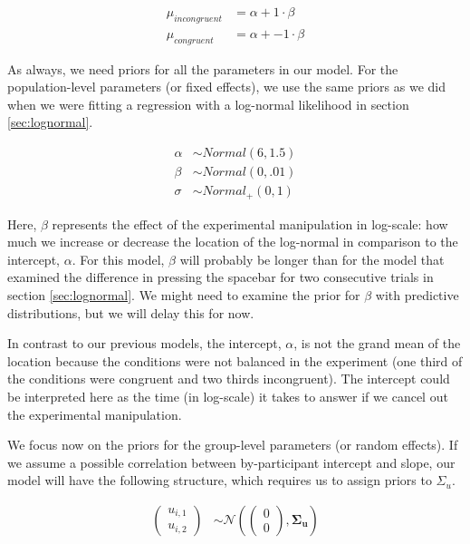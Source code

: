 \documentclass[12pt,]{krantz}
\theoremstyle{definition}
\theoremstyle{definition}
\theoremstyle{definition}
\theoremstyle{remark}
\begin{document}
\begin{equation}
\begin{aligned}
  \mu_{incongruent} &= \alpha + 1 \cdot  \beta \\
  \mu_{congruent} &= \alpha + -1 \cdot  \beta
  \end{aligned}
\end{equation}

As always, we need priors for all the parameters in our model. For the population-level parameters (or fixed effects), we use the same priors as we did when we were fitting a regression with a log-normal likelihood in section \ref{sec:lognormal}.

\begin{equation}
 \begin{aligned}
   \alpha & \sim Normal(6, 1.5) \\
   \beta  & \sim Normal(0, .01) \\
    \sigma  &\sim Normal_+(0, 1)
 \end{aligned}
 \end{equation}

Here, \(\beta\) represents the effect of the experimental manipulation in log-scale: how much we increase or decrease the location of the log-normal in comparison to the intercept, \(\alpha\). For this model, \(\beta\) will probably be longer than for the model that examined the difference in pressing the spacebar for two consecutive trials in section \ref{sec:lognormal}. We might need to examine the prior for \(\beta\) with predictive distributions, but we will delay this for now.

In contrast to our previous models, the intercept, \(\alpha\), is not the grand mean of the location because the conditions were not balanced in the experiment (one third of the conditions were congruent and two thirds incongruent). The intercept could be interpreted here as the time (in log-scale) it takes to answer if we cancel out the experimental manipulation.

We focus now on the priors for the group-level parameters (or random effects). If we assume a possible correlation between by-participant intercept and slope, our model will have the following structure, which requires us to assign priors to \(\Sigma_u\).

\begin{equation}
 \begin{aligned}
    {\begin{pmatrix}
    u_{i,1} \\
    u_{i,2}
    \end{pmatrix}}
   &\sim {\mathcal {N}}
    \left(
   {\begin{pmatrix} 
    0\\
    0
   \end{pmatrix}}
 ,\boldsymbol{\Sigma_u} \right) 
 \end{aligned}
 \end{equation}
\end{document}
